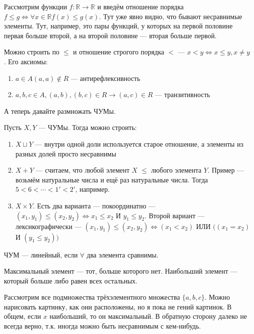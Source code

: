 Рассмотрим функции $f : \mathbb{R} \to \mathbb{R}$ и введём отношение порядка $f \le g \Leftrightarrow \forall x \in \mathbb{R} f(x) \le g(x)$. Тут уже явно видно, что бывают несравнимые элементы. Тут, например, это пары функций, у которых на первой половине первая больше второй, а на второй половине --- вторая больше первой.

Можно строить по $\le$ и отношение строгого порядка $<$ --- $x < y \Leftrightarrow x \le y, x \neq y$. Его аксиомы:


\begin{enumerate}
\item{$a \in A (a, a) \not\in R$} --- антирефлексивность
\item{$a, b, c \in A, (a, b), (b, c) \in R \to (a, c) \in R$ --- транзитивность}
\end{enumerate}

А теперь давайте размножать ЧУМы. 

Пусть $X, Y$ --- ЧУМы. Тогда можно строить:

\begin{enumerate}
	\item{$X \sqcup Y$ --- внутри одной доли используется старое отношение, а элементы из разных долей просто несравнимы}
	\item{$X + Y$ --- считаем, что любой элемент $X$ $\le$ любого элемента $Y$. Пример --- возьмём натуральные числа и ещё раз натуральные числа. Тогда $5 < 6 < \cdots < 1' < 2'$, например.}
	\item{$X \times Y$. Есть два варианта --- покоординатно --- $(x_1, y_1) \le (x_2, y_2) \Leftrightarrow x_1 \le x_2 $ И $y_1 \le y_2$. Второй вариант --- лексикографически --- $(x_1, y_1) \le (x_2, y_2) \Leftrightarrow (x_1 < x_2)$ ИЛИ $((x_1 = x_2)$ И $ (y_1 \le y_2))$ }
\end{enumerate}

\begin{definition}
	ЧУМ --- линейный, если $\forall$ два элемента сравнимы. 
\end{definition}

\begin{definition}
Максимальный элемент --- тот, больше которого нет. Наибольший элемент --- который больше либо равен всех остальных. 
\end{definition}

Рассмотрим все подмножества трёхэлементного множества $\{a, b, c\}$. Можно нарисовать картинку, как они расположены, но я пока не гений картинок. В общем, если $x$ наибольший, то он максимальный. В обратную сторону далеко не всегда верно, т.к. иногда можно быть несравнимым с кем-нибудь. 


